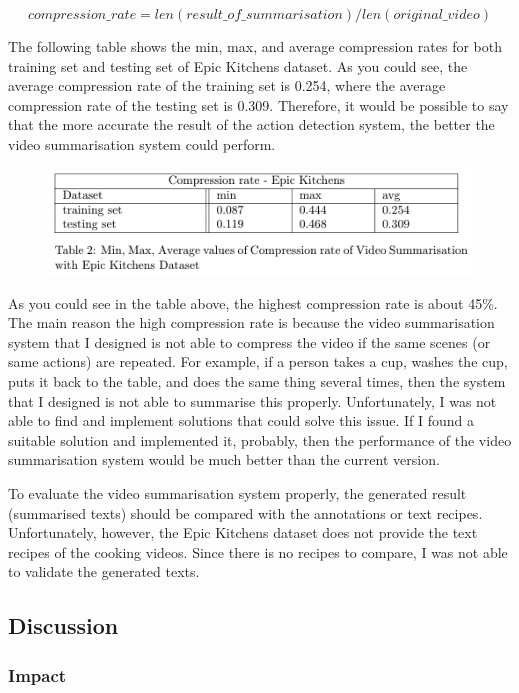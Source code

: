 \documentclass{article}
\begin{document}
\[compression\_rate = len(result\_of\_summarisation) / len(original\_video)\]

The following table shows the min, max, and average compression rates for both training set and testing set of Epic Kitchens dataset. As you could see, the average compression rate of the training set is 0.254, where the average compression rate of the testing set is 0.309. Therefore, it would be possible to say that the more accurate the result of the action detection system, the better the video summarisation system could perform.

\begin{figure}[H]
    \centering
    \includegraphics[scale=0.7]{imgs/compression_rate.png}
    \label{fig:compression_rate_table_EpicKitchens}
\end{figure}

As you could see in the table above, the highest compression rate is about 45\%. The main reason the high compression rate is because the video summarisation system that I designed is not able to compress the video if the same scenes (or same actions) are repeated. For example, if a person takes a cup, washes the cup, puts it back to the table, and does the same thing several times, then the system that I designed is not able to summarise this properly. Unfortunately, I was not able to find and implement solutions that could solve this issue. If I found a suitable solution and implemented it, probably, then the performance of the video summarisation system would be much better than the current version.

To evaluate the video summarisation system properly, the generated result (summarised texts) should be compared with the annotations or text recipes. Unfortunately, however, the Epic Kitchens dataset does not provide the text recipes of the cooking videos. Since there is no recipes to compare, I was not able to validate the generated texts.


\subsection{Discussion}

\subsubsection{Impact}
\end{document}
